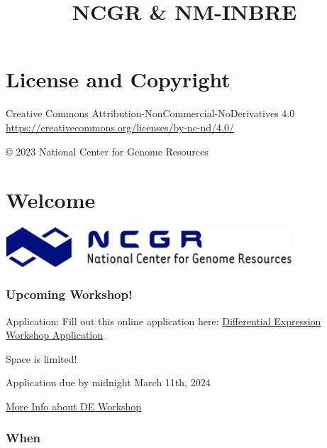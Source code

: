 \documentclass[
]{book}
\title{NCGR \& NM-INBRE}
\author{}
\date{\vspace{-2.5em}}
\begin{document}
\maketitle

{
\setcounter{tocdepth}{1}
\tableofcontents
}
\hypertarget{license-and-copyright}{%
\chapter*{License and Copyright}\label{license-and-copyright}}

Creative Commons Attribution-NonCommercial-NoDerivatives 4.0
\url{https://creativecommons.org/licenses/by-nc-nd/4.0/}

© 2023 National Center for Genome Resources

\hypertarget{welcome}{%
\chapter*{Welcome}\label{welcome}}

\includegraphics[width=0.8\textwidth,height=\textheight]{./Figures/ncgr.png}

\hypertarget{upcoming-workshop}{%
\subsection*{Upcoming Workshop!}\label{upcoming-workshop}}

Application: Fill out this online application here:
\href{https://docs.google.com/forms/d/e/1FAIpQLScpoKxE0yAnCK3yOl5hBde7MtOWCOeXYxvjBfWyDcA9hHDGrw/viewform}{Differential Expression Workshop Application}

Space is limited!

Application due by midnight March 11th, 2024

\href{https://inbre.ncgr.org/ncgr-INBRE-2024/differential-expression-workshop.html\#differential-expression-workshop}{More Info about DE Workshop}

\hypertarget{when}{%
\subsection*{When}\label{when}}
\end{document}
